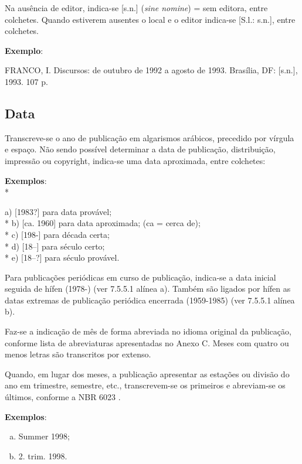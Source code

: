 Na ausência de editor, indica-se [s.n.] (\textit{sine nomine}) = sem editora, entre colchetes. Quando estiverem ausentes o local e o editor indica-se [S.l.: s.n.], entre colchetes.

\begin{exemplomanual}
\textbf{Exemplo}:\\
\begin{singlespace}
FRANCO, I. Discursos: de outubro de 1992 a agosto de 1993. Brasília, DF: [s.n.], 1993. 107 p.
\end{singlespace}
\end{exemplomanual}


\subsection{Data}

Transcreve-se o ano de publicação em algarismos arábicos, precedido por vírgula e espaço. Não sendo possível determinar a data de publicação, distribuição, impressão ou copyright, indica-se uma data aproximada, entre colchetes:

\begin{exemplomanual}
\textbf{Exemplos}:\\*

a) [1983?] para data provável;\\*
b) [ca. 1960] para data aproximada; (ca = cerca de);\\*
c) [198-] para década certa;\\*
d) [18--] para século certo;\\*
e) [18--?] para século provável.
\end{exemplomanual}

Para publicações periódicas em curso de publicação, indica-se a data inicial seguida de hífen (1978-) (ver 7.5.5.1 alínea a). Também são ligados por hífen as datas extremas de publicação periódica encerrada (1959-1985) (ver 7.5.5.1 alínea b).

Faz-se a indicação de mês de forma abreviada no idioma original da publicação, conforme lista de abreviaturas apresentadas no Anexo C. Meses com quatro ou menos letras são transcritos por extenso.

Quando, em lugar dos meses, a publicação apresentar as estações ou divisão do ano em trimestre, semestre, etc., transcrevem-se os primeiros e abreviam-se os últimos, conforme a NBR 6023 \cite{NBR6023:2002}.

\begin{exemplomanual}
\textbf{Exemplos}:

\begin{enumerate}[a)]
  \item  Summer 1998;
  \item  2. trim. 1998.
\end{enumerate}
\end{exemplomanual}

